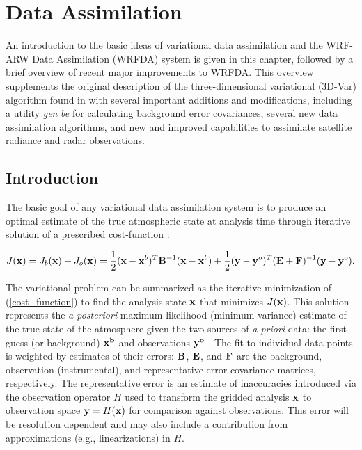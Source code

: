 \chapter{Data Assimilation}
\label{var_chap}

An introduction to the basic ideas of variational data assimilation and
the WRF-ARW Data Assimilation (WRFDA) system \citep{barker12} is given in this chapter, followed by a brief
overview of recent major improvements to WRFDA.  This overview
supplements the original description of the three-dimensional
variational (3D-Var) algorithm found in \citet{barker04} with
several important additions and modifications, including a utility {\it gen$\_$be}
for calculating background error covariances, several new data assimilation algorithms, and
new and improved capabilities to assimilate satellite radiance and radar observations.

\section{Introduction}
\label{var-intro}

The basic goal of any variational data assimilation system is to produce
an optimal estimate of the true atmospheric state at analysis time
through iterative solution of a prescribed cost-function \citep{ide97}:

\begin{equation}
J({\bf x}) = J_b({\bf x}) + J_o({\bf x}) = \frac{1}{2 
} ({\bf x}-{\bf x}^{b})^{T}{\bf B}^{-1}({\bf x}-{\bf x}^{b}) + 
\frac{1}{2}
({\bf y}-{\bf y}^{o})^{T}({\bf E+F})^{-1}({\bf y}-{\bf y}^{o}).
\label{cost_function}
\end{equation}

The variational problem can be summarized as the iterative minimization
of (\ref{cost_function}) to find the analysis state ${\bf x}$ that
minimizes $J({\bf x})$. This solution represents the {\it a posteriori}
maximum likelihood (minimum variance) estimate of the true state of the
atmosphere given the two sources of {\it a priori} data: the first guess
(or background) ${\bf x^{b}}$ and observations ${\bf y^{o}}$
\citep{lorenc86}. The fit to individual data points is weighted by
estimates of their errors: ${\bf B}$, ${\bf E}$, and ${\bf F}$ are the
background, observation (instrumental), and representative error
covariance matrices, respectively. The representative error is an estimate of
inaccuracies introduced via the observation operator $H$ used to
transform the gridded analysis ${\bf x}$ to observation space ${\bf
y}=H({\bf x})$ for comparison against observations. This error will be
resolution dependent and may also include a contribution from
approximations (e.g., linearizations) in $H$.

